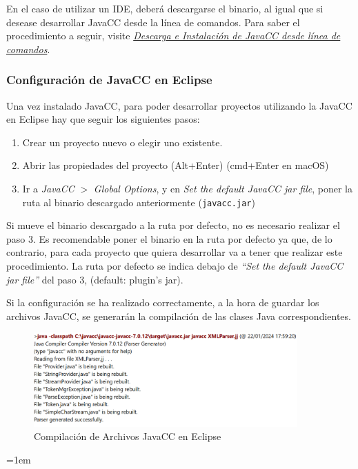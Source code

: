 En el caso de utilizar un IDE, deberá descargarse el binario, al igual que si desease desarrollar JavaCC desde la línea de comandos. Para saber el procedimiento a seguir, visite \href{sec:descargaeinstalaciondejavaccdesdelineadecomandos}{\textit{Descarga e Instalación de JavaCC desde línea de comandos}}.

\subsubsection{Configuración de JavaCC en Eclipse}

Una vez instalado JavaCC, para poder desarrollar proyectos utilizando la JavaCC en Eclipse hay que seguir los siguientes pasos:
\begin{enumerate}
    \item Crear un proyecto nuevo o elegir uno existente.
    \item Abrir las propiedades del proyecto (Alt+Enter) (cmd+Enter en macOS)
    \item  Ir a \textit{JavaCC} $>$ \textit{Global Options}, y en \textit{Set the default JavaCC jar file}, poner la ruta al binario descargado anteriormente (\lstinline|javacc.jar|)
\end{enumerate}

Si mueve el binario descargado a la ruta por defecto, no es necesario realizar el paso 3. Es recomendable poner el binario en la ruta por defecto ya que, de lo contrario, para cada proyecto que quiera desarrollar va a tener que realizar este procedimiento. La ruta por defecto se indica debajo de \textit{“Set the default JavaCC jar file”} del paso 3, (default: plugin’s jar).

Si la configuración se ha realizado correctamente, a la hora de guardar los archivos JavaCC, se generarán la compilación de las clases Java correspondientes.

\begin{figure}[H]
    \centering
    \includegraphics[width=0.9\textwidth]{imagenes/javacccompilation.png}
    \caption{Compilación de Archivos JavaCC en Eclipse}
    \label{fig:javacccompilation}
\end{figure}
\emergencystretch=1em
